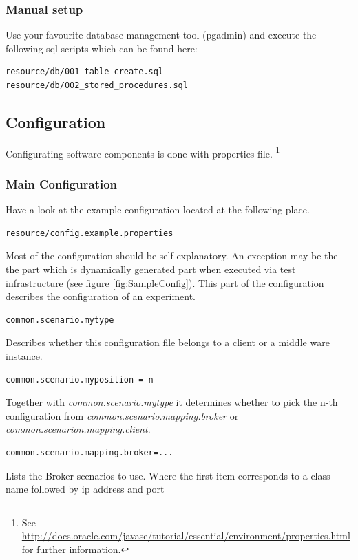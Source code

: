 \documentclass[a4paper]{article}
\begin{document}
\subsubsection{Manual setup}
Use your favourite database management tool (pgadmin) and execute the following sql scripts which can be found here:

\begin{verbatim} 
resource/db/001_table_create.sql
resource/db/002_stored_procedures.sql
\end{verbatim}

\subsection{Configuration}
Configurating software components is done with properties file. \footnote{See \url{http://docs.oracle.com/javase/tutorial/essential/environment/properties.html} for further information.}
\subsubsection{Main Configuration}
\label{subsub:MainConfig}

Have a look at the example configuration located at the following place.

\begin{verbatim} 
resource/config.example.properties
\end{verbatim}

Most of the configuration should be self explanatory. An exception may be the the part which is dynamically generated part when executed via test infrastructure (see figure \ref{fig:SampleConfig}). This part of the configuration describes the configuration of an experiment.

\begin{verbatim} 
common.scenario.mytype
\end{verbatim}
Describes whether this configuration file belongs to a client or a middle ware instance.

\begin{verbatim} 
common.scenario.myposition = n
\end{verbatim}
Together with \textit{common.scenario.mytype} it determines whether to pick the n-th configuration from\textit{ common.scenario.mapping.broker} or \textit{common.scenarion.mapping.client}.

\begin{verbatim} 
common.scenario.mapping.broker=...
\end{verbatim}
Lists the Broker scenarios to use. Where the first item corresponds to a class name followed by ip address and port
\end{document}
